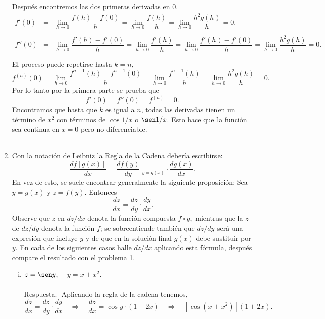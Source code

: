 \begin{enumerate}[\bfseries 1.]
	 Después encontremos las dos primeras derivadas en $0$.
	 $$\begin{array}{rcl}
	     f'(0)&=&\lim\limits_{h\to 0}\dfrac{f(h)-f(0)}{h}=\lim\limits_{h\to 0}\dfrac{f(h)}{h}=\lim\limits_{h\to 0}\dfrac{h^2g(h)}{h}=0.\\\\
	     f''(0) &=& \lim\limits_{h\to 0}\dfrac{f'(h)-f'(0)}{h}=\lim\limits_{h\to 0}\dfrac{f'(h)}{h}=\lim\limits_{h\to 0}\dfrac{f'(h)-f'(0)}{h}=\lim\limits_{h\to 0}\dfrac{h^2g(h)}{h}=0.\\\\
	 \end{array}$$
	 El proceso puede repetirse hasta $k=n$,
	 $$f^{(n)}(0)=\lim_{h\to 0}\dfrac{f^{n-1}(h)-f^{n-1}(0)}{h}=\lim_{h\to 0}\dfrac{f^{n-1}(h)}{h}=\lim_{h\to 0}\dfrac{h^2g(h)}{h}=0.$$
	 Por lo tanto por la primera parte se prueba que 
	 $$f'(0)=f''(0)=f^{(n)}=0.$$
	 Encontramos que hasta que $k$ es igual a $n$, todas las derivadas tienen un término de $x^2$ con términos de $\cos 1/x$ o $\sen 1/x$. Esto hace que la función sea continua en $x=0$ pero no diferenciable.\\\\


     \item Con la notación de Leibniz la Regla de la Cadena debería escribirse:
	 $$\dfrac{df\left[g(x)\right]}{dx}=\dfrac{df(y)}{dy}\bigg|_{y=g(x)}\cdot \dfrac{dg(x)}{dx}.$$
	 En vez de esto, se suele encontrar generalmente la siguiente proposición: Sea $y=g(x)$ y $z=f(y)$. Entonces
	 $$\dfrac{dz}{dx}=\dfrac{dz}{dy}\cdot \dfrac{dy}{dx}.$$
	 Observe que $z$ en $dz/dx$ denota la función compuesta $f\circ g,$ mientras que la $z$ de $dz/dy$ denota la función $f$; se sobreentiende también que $dz/dy$ será una expresión que incluye $y$ y de que en la solución final $g(x)$ debe sustituir por $y$. En cada de los siguientes casos halle $dz/dx$ aplicando esta fórmula, después compare el resultado con el problema 1.

	 \begin{enumerate}[(i)]

	     \item $z=\sen y$, $\quad y=x+x^2.$\\\\
		 Respuesta.-\; Aplicando la regla de la cadena tenemos,
		 $$\dfrac{dz}{dx}=\dfrac{dz}{dy}\cdot \dfrac{dy}{dx}\quad \Rightarrow \quad \dfrac{dz}{dx}=\cos y \cdot (1-2x)\quad \Rightarrow \quad \left[\cos\left(x+x^2\right)\right](1+2x).$$\\


\end{enumerate}
\end{enumerate}
